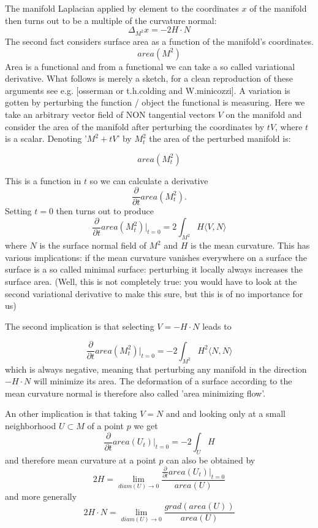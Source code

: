 The manifold Laplacian applied by element to the coordinates $x$ of the manifold then turns out to be a multiple of the curvature normal:
\begin{equation} \Delta_{M^2}x= -2H\cdot N \label{eqn::laplaceMeancurve}\end{equation}
The second fact considers surface area as a function of the manifold's coordinates.
\[area(M^2)\]
Area is a functional and from a functional we can take a so called variational derivative. What follows is merely a sketch, for a clean reproduction of these arguments see e.g. [osserman or t.h.colding and W.minicozzi]. A variation is gotten by perturbing the function / object the functional is measuring. Here we take an arbitrary vector field of NON tangential vectors $V$ on the manifold and consider the area of the manifold after perturbing the coordinates by $tV$, where $t$ is a scalar. Denoting '$M^2 + tV$' by $M^2_t$ the area of the perturbed manifold is:

\[area(M^2_t)\]

This is a function in $t$ so we can calculate a derivative
\[\frac{\partial}{\partial t}area(M^2_t).\]
Setting $t=0$ then turns out to produce
\[\frac{\partial}{\partial t}area(M^2_t)|_{t=0} = 2\int_{M^2}H\langle V, N \rangle\]
where $N$ is the surface normal field of $M^2$ and $H$ is the mean curvature. This has various implications: if the mean curvature vanishes everywhere on a surface the surface is a so called minimal surface: perturbing it locally always increases the surface area. (Well, this is not completely true: you would have to look at the second variational derivative to make this sure, but this is of no importance for us)

The second implication is that selecting $V = -H\cdot N$ leads to

\[\frac{\partial}{\partial t}area(M^2_t)|_{t=0} = -2\int_{M^2}H^2\langle N, N \rangle\]
which is always negative, meaning that perturbing any manifold in the direction $-H\cdot N$ will minimize its area. The deformation of a surface according to the mean curvature normal is therefore also called 'area minimizing flow'.

An other implication is that taking $V= N$ and and looking only at a small neighborhood $U \subset M$ of a point $p$ we get
\[\frac{\partial}{\partial t}area(U_t)|_{t=0} = -2\int_{U}H\]
and therefore mean curvature at a point $p$ can also be obtained by
\[ 2H=\lim_{diam(U) \rightarrow 0}\frac{\frac{\partial}{\partial t}area(U_t)|_{t=0}}{area(U)}\]
and more generally
\[2H\cdot N =\lim_{diam(U) \rightarrow 0}\frac{grad(area(U))}{area(U)}\]

